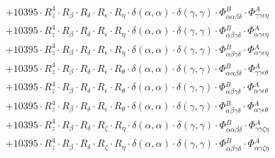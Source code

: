 \documentclass{article}
\begin{document}
\begin{subequations}
\begin{gather}
\begin{array}{c}
 \\[0.2em] 		 + 10395 \cdot R_{z}^{4} \cdot R_{\beta{}} \cdot R_{\delta{}} \cdot R_{\epsilon{}} \cdot R_{\eta{}} \cdot \delta{}\left(\alpha{}, \alpha{}\right) \cdot \delta{}\left(\gamma{}, \gamma{}\right) \cdot \Phi{}^{B}_{\alpha{}\alpha{}\beta{}\delta{}} \cdot \Phi{}^{A}_{\gamma{}\gamma{}\epsilon{}\eta{}} 
 \\[0.2em] 		 + 10395 \cdot R_{z}^{4} \cdot R_{\beta{}} \cdot R_{\delta{}} \cdot R_{\epsilon{}} \cdot R_{\eta{}} \cdot \delta{}\left(\alpha{}, \alpha{}\right) \cdot \delta{}\left(\gamma{}, \gamma{}\right) \cdot \Phi{}^{B}_{\alpha{}\beta{}\gamma{}\delta{}} \cdot \Phi{}^{A}_{\alpha{}\gamma{}\epsilon{}\eta{}} 
 \\[0.2em] 		 + 10395 \cdot R_{z}^{4} \cdot R_{\beta{}} \cdot R_{\delta{}} \cdot R_{\epsilon{}} \cdot R_{\eta{}} \cdot \delta{}\left(\alpha{}, \alpha{}\right) \cdot \delta{}\left(\gamma{}, \gamma{}\right) \cdot \Phi{}^{B}_{\alpha{}\beta{}\gamma{}\delta{}} \cdot \Phi{}^{A}_{\alpha{}\gamma{}\epsilon{}\eta{}} 
 \\[0.2em] 		 + 10395 \cdot R_{z}^{4} \cdot R_{\beta{}} \cdot R_{\delta{}} \cdot R_{\epsilon{}} \cdot R_{\theta{}} \cdot \delta{}\left(\alpha{}, \alpha{}\right) \cdot \delta{}\left(\gamma{}, \gamma{}\right) \cdot \Phi{}^{B}_{\alpha{}\alpha{}\beta{}\delta{}} \cdot \Phi{}^{A}_{\gamma{}\gamma{}\epsilon{}\theta{}} 
 \\[0.2em] 		 + 10395 \cdot R_{z}^{4} \cdot R_{\beta{}} \cdot R_{\delta{}} \cdot R_{\epsilon{}} \cdot R_{\theta{}} \cdot \delta{}\left(\alpha{}, \alpha{}\right) \cdot \delta{}\left(\gamma{}, \gamma{}\right) \cdot \Phi{}^{B}_{\alpha{}\beta{}\gamma{}\delta{}} \cdot \Phi{}^{A}_{\alpha{}\gamma{}\epsilon{}\theta{}} 
 \\[0.2em] 		 + 10395 \cdot R_{z}^{4} \cdot R_{\beta{}} \cdot R_{\delta{}} \cdot R_{\epsilon{}} \cdot R_{\theta{}} \cdot \delta{}\left(\alpha{}, \alpha{}\right) \cdot \delta{}\left(\gamma{}, \gamma{}\right) \cdot \Phi{}^{B}_{\alpha{}\beta{}\gamma{}\delta{}} \cdot \Phi{}^{A}_{\alpha{}\gamma{}\epsilon{}\theta{}} 
 \\[0.2em] 		 + 10395 \cdot R_{z}^{4} \cdot R_{\beta{}} \cdot R_{\delta{}} \cdot R_{\zeta{}} \cdot R_{\eta{}} \cdot \delta{}\left(\alpha{}, \alpha{}\right) \cdot \delta{}\left(\gamma{}, \gamma{}\right) \cdot \Phi{}^{B}_{\alpha{}\alpha{}\beta{}\delta{}} \cdot \Phi{}^{A}_{\gamma{}\gamma{}\zeta{}\eta{}} 
 \\[0.2em] 		 + 10395 \cdot R_{z}^{4} \cdot R_{\beta{}} \cdot R_{\delta{}} \cdot R_{\zeta{}} \cdot R_{\eta{}} \cdot \delta{}\left(\alpha{}, \alpha{}\right) \cdot \delta{}\left(\gamma{}, \gamma{}\right) \cdot \Phi{}^{B}_{\alpha{}\beta{}\gamma{}\delta{}} \cdot \Phi{}^{A}_{\alpha{}\gamma{}\zeta{}\eta{}} 

\end{array}
\end{gather}
\end{subequations}
\end{document}
